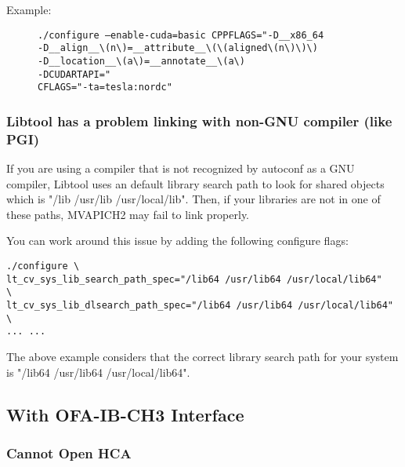 \begin{small}
    \begin{description}
        \item[Example:] \texttt{./configure --enable-cuda=basic
            CPPFLAGS="-D\_\_x86\_64 \\
            -D\_\_align\_\_\textbackslash(n\textbackslash)=\_\_attribute\_\_\textbackslash(\textbackslash(aligned\textbackslash(n\textbackslash)\textbackslash)\textbackslash) \\
            -D\_\_location\_\_\textbackslash(a\textbackslash)=\_\_annotate\_\_\textbackslash(a\textbackslash) \\
            -DCUDARTAPI="\\
            CFLAGS="-ta=tesla:nordc"}
    \end{description}
\end{small}


\subsubsection{Libtool has a problem linking with non-GNU compiler (like PGI)}

If you are using a compiler that is not recognized by autoconf as a GNU compiler,
Libtool uses an default library search path to look for shared objects which is "/lib /usr/lib /usr/local/lib".
Then, if your libraries are not in one of these paths, MVAPICH2 may fail to link properly.

You can work around this issue by adding the following configure flags:

\begin{verbatim}
./configure \
lt_cv_sys_lib_search_path_spec="/lib64 /usr/lib64 /usr/local/lib64"   \
lt_cv_sys_lib_dlsearch_path_spec="/lib64 /usr/lib64 /usr/local/lib64" \
... ...
\end{verbatim}

The above example considers that the correct library search path for your system is "/lib64 /usr/lib64 /usr/local/lib64".

\subsection{With OFA-IB-CH3 Interface}

\subsubsection{Cannot Open HCA}

